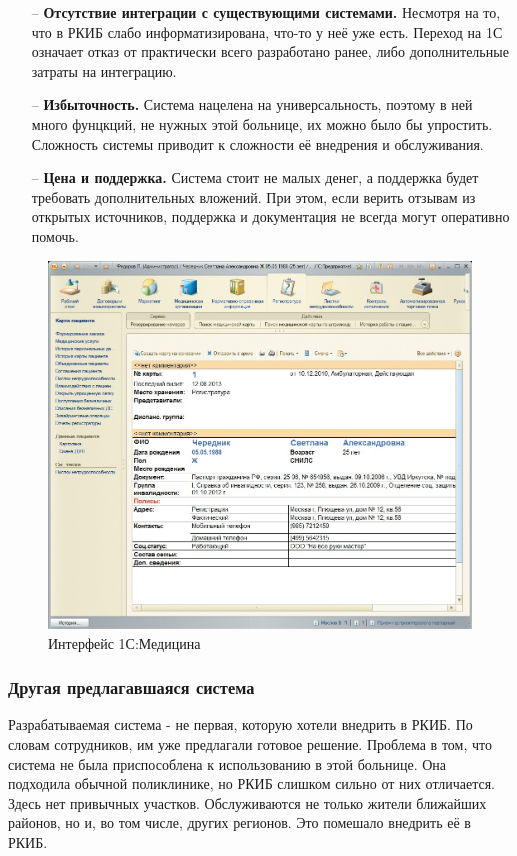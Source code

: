 \documentclass[a4paper,article]{article}
\begin{document}
        \begin{itemize}[nolistsep]
            \item[--] \textbf{Отсутствие интеграции с существующими системами.} Несмотря на то, что в РКИБ слабо информатизирована, что-то у неё уже есть. Переход на 1С означает отказ от практически всего разработано ранее, либо дополнительные затраты на интеграцию.
            \item[--] \textbf{Избыточность.} Система нацелена на универсальность, поэтому в ней много фунцкций, не нужных этой больнице, их можно было бы упростить. Сложность системы приводит к сложности её внедрения и обслуживания.
            \item[--] \textbf{Цена и поддержка.} Система стоит не малых денег, а поддержка будет требовать дополнительных вложений. При этом, если верить отзывам из открытых источников, поддержка и документация не всегда могут оперативно помочь.
        \end{itemize}

        \begin{figure}[h]

            \centering

            \includegraphics[width=0.6\linewidth]{Интерфейс 1С:Медицина.png}

            \caption{\centering Интерфейс 1С:Медицина}

            \label{fig:Интерфейс 1С:Медицина}

        \end{figure}

    \subsubsection{Другая предлагавшаяся система}

        Разрабатываемая система - не первая, которую хотели внедрить в РКИБ. По словам сотрудников, им уже предлагали готовое решение. Проблема в том, что система не была приспособлена к использованию в этой больнице. Она подходила обычной поликлинике, но РКИБ слишком сильно от них отличается. Здесь нет привычных участков. Обслуживаются не только жители ближайших районов, но и, во том числе, других регионов. Это помешало внедрить её в РКИБ.
\end{document}
